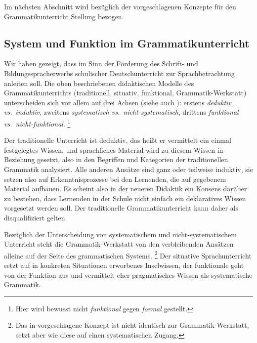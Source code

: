 Im nächsten Abschnitt wird bezüglich der vorgeschlagenen Konzepte für den Grammatikunterricht Stellung bezogen.

\subsection{System und Funktion im Grammatikunterricht}
\label{sec:systemundfunktionimgrammatikunterricht}

Wir haben gezeigt, dass im Sinn der Förderung des Schrift- und Bildungsspracherwerbs schulischer Deutschunterricht zur Sprachbetrachtung anleiten soll.
Die oben beschriebenen didaktischen Modelle des Grammatikunterrichts (traditionell, situativ, funktional, Grammatik-Werkstatt) unterscheiden sich vor allem auf drei Achsen (siehe auch \citealt[8--9]{Menzel2017}):
erstens \textit{deduktiv vs.\ induktiv}, zweitens \textit{systematisch vs.\ nicht-systematisch}, drittens \textit{funktional vs.\ nicht-funktional}.%
\footnote{Hier wird bewusst nicht \textit{funktional} gegen \textit{formal} gestellt.}

Der traditionelle Unterricht ist deduktiv, das heißt er vermittelt ein einmal festgelegtes Wissen, und sprachliches Material wird zu diesem Wissen in Beziehung gesetzt, also in den Begriffen und Kategorien der traditionellen Grammatik analysiert.
Alle anderen Ansätze sind ganz oder teilweise induktiv, sie setzen also auf Erkenntnisprozesse bei den Lernenden, die auf gegebenem Material aufbauen.
Es scheint also in der neueren Didaktik ein Konsens darüber zu bestehen, dass Lernenden in der Schule nicht einfach ein deklaratives Wissen vorgesetzt werden soll.
Der traditionelle Grammatikunterricht kann daher als disqualifiziert gelten.

Bezüglich der Unterscheidung von systematischem und nicht-systematischem Unterricht steht die Grammatik-Werkstatt von den verbleibenden Ansätzen alleine auf der Seite des grammatischen Systems.%
\footnote{Das in \citet{Bredel2013} vorgeschlagene Konzept ist nicht identisch zur Grammatik-Werkstatt, setzt aber wie diese auf einen systematischen Zugang.}
Der situative Sprachunterricht setzt auf in konkreten Situationen erworbenes Inselwissen, der funktionale geht von der Funktion aus und vermittelt eher pragmatisches Wissen als systematische Grammatik.

